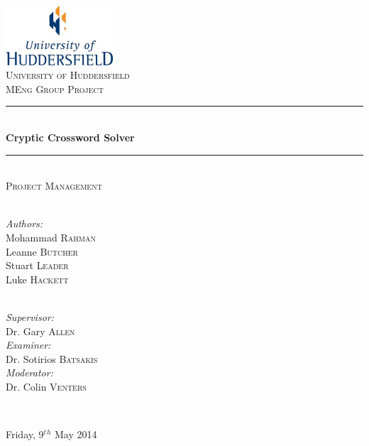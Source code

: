 \newcommand{\HRule}{\rule{\linewidth}{0.5mm}}

\begin{titlepage}
  \begin{center}

  \includegraphics[width=0.3\textwidth]{../UoHLogo.jpg} \\[2.5cm]

  \textsc{\LARGE University of Huddersfield} \\[1.5cm]

  \textsc{\Large MEng Group Project} \\[0.75cm]

  \HRule \\[0.4cm]
    { \huge \bfseries Cryptic Crossword Solver }
  \\[0.1cm]

  \HRule \\[0.75cm]

  \textsc{\Large Project Management} \\[2cm]

  \begin{minipage}{0.4\textwidth}
    \begin{flushleft} \large  ~\\
      \emph{Authors:}          \\[0.5ex]
      Mohammad \textsc{Rahman} \\[0.5ex]
      Leanne \textsc{Butcher}  \\[0.5ex]
      Stuart \textsc{Leader}   \\[0.5ex]
      Luke \textsc{Hackett} 
    \end{flushleft}
  \end{minipage}
  \begin{minipage}{0.4\textwidth}
    \begin{flushright} \large ~\\
      \emph{Supervisor:} \\ 
      Dr. Gary \textsc{Allen}
      ~\\[1ex]
      \emph{Examiner:} \\
      Dr. Sotirios \textsc{Batsakis}
      ~\\[1ex]
      \emph{Moderator:} \\
      Dr. Colin \textsc{Venters} 
    \end{flushright}
  \end{minipage}

  ~\\[0.01cm]


  \vfill

  {\large Friday, 9$^t$$^h$ May 2014}

  \end{center}
\end{titlepage}
